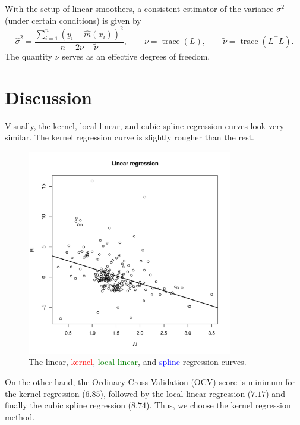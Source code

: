 \documentclass[10pt]{article}
\DeclareMathOperator*{\trace}{trace}
\begin{document}
    With the setup of linear smoothers, a consistent estimator of the variance
    $\sigma^2$ (under certain conditions) is given by \[
        \widehat{\sigma}^2 = \frac{\sum_{i = 1}^n (y_i - \widehat{m}(x_i))^2}{n - 2\nu
        + \tilde{\nu}}, \qquad
        \nu = \trace(L), \qquad
        \tilde{\nu} = \trace(L^\top L).
    \] The quantity $\nu$ serves as an effective degrees of freedom.



    \section{Discussion}

    Visually, the kernel, local linear, and cubic spline regression curves
    look very similar. The kernel regression curve is slightly rougher than
    the rest.

    \begin{figure}[H]
    \begin{center}
        \includegraphics[page = 7, width = 0.8\textwidth]{glass.pdf}
    \end{center}
    \vspace{-1em}
    \caption{
       The linear, \textcolor{red}{kernel}, \textcolor{green}{local linear},
       and \textcolor{blue}{spline} regression curves.
    }
    \label{fig:glass_spline}
    \end{figure}

    On the other hand, the Ordinary Cross-Validation (OCV) score is minimum
    for the kernel regression ($6.85$), followed by the local linear
    regression ($7.17$) and finally the cubic spline regression ($8.74$).
    Thus, we choose the kernel regression method.
\end{document}
